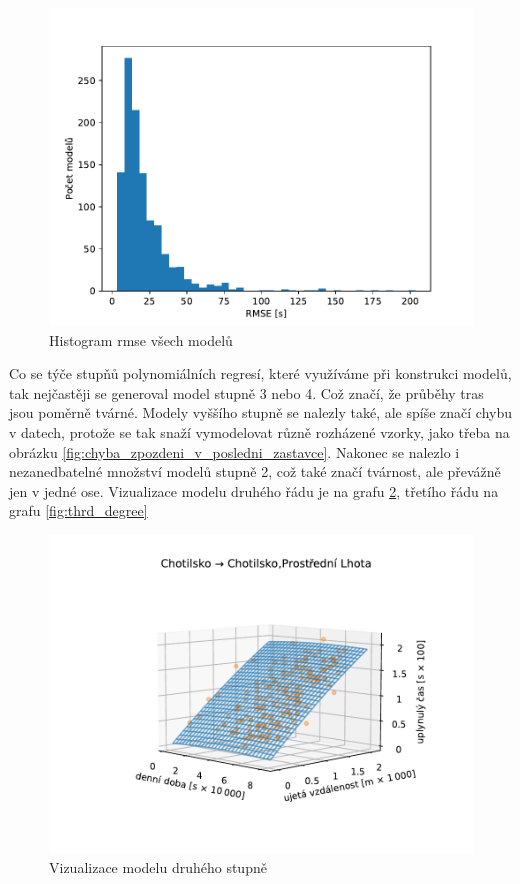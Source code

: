 \begin{figure}
   \centering
 \includegraphics[width=\linewidth]{../img/rmse}
 \caption{Histogram \gls{rmse} všech modelů}
 \label{fig:rmse}
\end{figure}


\bigbreak


Co se týče stupňů polynomiálních regresí, které využíváme při konstrukci modelů, tak nejčastěji se generoval model stupně 3 nebo 4. Což značí, že průběhy tras jsou poměrně tvárné. Modely vyššího stupně se nalezly také, ale spíše značí chybu v datech, protože se tak snaží vymodelovat různě rozházené vzorky, jako třeba na obrázku \ref{fig:chyba_zpozdeni_v_posledni_zastavce}. Nakonec se nalezlo i nezanedbatelné množství modelů stupně 2, což také značí tvárnost, ale převážně jen v jedné ose. Vizualizace modelu druhého řádu je na grafu \ref{fig:second_degree}, třetího řádu na grafu \ref{fig:thrd_degree}




\begin{figure}
   \centering
 \includegraphics[width=\linewidth]{../img/23_24}
 \caption{Vizualizace modelu druhého stupně}
 \label{fig:second_degree}
\end{figure}




